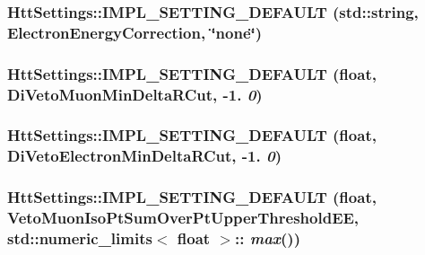 \hypertarget{classHttSettings_ae56fd4ee1a4ba1dfad77905b9106a538}{
\subsubsection[{IMPL\_\-SETTING\_\-DEFAULT}]{\setlength{\rightskip}{0pt plus 5cm}HttSettings::IMPL\_\-SETTING\_\-DEFAULT (std::string, \/  ElectronEnergyCorrection, \/  \char`\"{}none\char`\"{})}}
\label{classHttSettings_ae56fd4ee1a4ba1dfad77905b9106a538}
\hypertarget{classHttSettings_ac82d12116eac0c155589c0040238bcc3}{
\subsubsection[{IMPL\_\-SETTING\_\-DEFAULT}]{\setlength{\rightskip}{0pt plus 5cm}HttSettings::IMPL\_\-SETTING\_\-DEFAULT (float, \/  DiVetoMuonMinDeltaRCut, \/  -\/1. {\em 0})}}
\label{classHttSettings_ac82d12116eac0c155589c0040238bcc3}
\hypertarget{classHttSettings_a11d0797ee5f15ceedc51c0c83b097dcb}{
\subsubsection[{IMPL\_\-SETTING\_\-DEFAULT}]{\setlength{\rightskip}{0pt plus 5cm}HttSettings::IMPL\_\-SETTING\_\-DEFAULT (float, \/  DiVetoElectronMinDeltaRCut, \/  -\/1. {\em 0})}}
\label{classHttSettings_a11d0797ee5f15ceedc51c0c83b097dcb}
\hypertarget{classHttSettings_ad2400b8e6df12ee3dffd42c80a2b5025}{
\subsubsection[{IMPL\_\-SETTING\_\-DEFAULT}]{\setlength{\rightskip}{0pt plus 5cm}HttSettings::IMPL\_\-SETTING\_\-DEFAULT (float, \/  VetoMuonIsoPtSumOverPtUpperThresholdEE, \/  std::numeric\_\-limits$<$ float $>$:: {\em max}())}}
\label{classHttSettings_ad2400b8e6df12ee3dffd42c80a2b5025}
